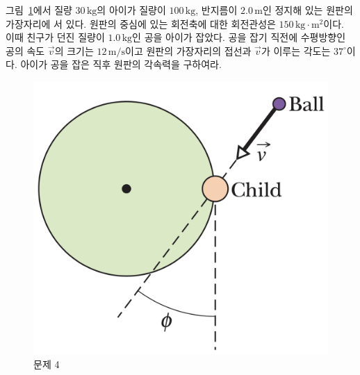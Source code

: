 \documentclass[floatfix,nofootinbib,superscriptaddress,fleqn]{revtex4-2}
\begin{document}
그림~\ref{fig:4}에서 질량 $30\,\mathrm{kg}$의 아이가 질량이 $100\,\mathrm{kg}$, 반지름이 
$2.0\,\mathrm{m}$인 정지해 있는 원판의 가장자리에 서 있다. 원판의 중심에 있는 회전축에
대한 회전관성은 $150\,\mathrm{kg\cdot m^2}$이다. 이때 친구가 던진
질량이 $1.0\,\mathrm{kg}$인 공을 아이가 잡았다. 공을 잡기 직전에 수평방향인 공의
속도 $\vec{v}$의 크기는 $12\,\mathrm{m/s}$이고 원판의 가장자리의 접선과
$\vec{v}$가 이루는 각도는 $37^\circ$이다. 아이가 공을 잡은 직후 원판의
각속력을 구하여라. 
\begin{figure}[ht]
  \centering
\includegraphics[scale=0.25]{Qfig14-4-20220427.png} 
  \caption{문제 4}
  \label{fig:4}
\end{figure}
\end{document}
